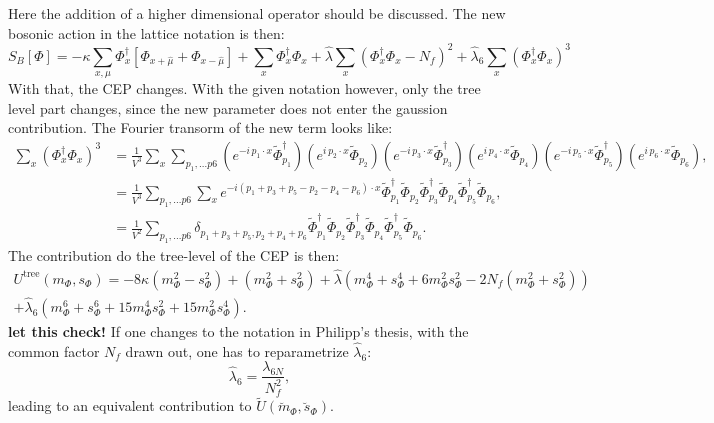 Here the addition of a higher dimensional operator should be discussed. The new bosonic action in the lattice notation is then:
\begin{equation}\label{eq:bosonicLatticeActionWithLambda_6}
 S_B[\Phi]  = -\kappa \sum\limits_{x,\mu} \Phi_x^{\dagger} \left[\Phi_{x+\hat\mu} + \Phi_{x-\hat\mu} \right] 
              + \sum\limits_x \Phi_x^{\dagger} \Phi_x 
              + \hat{\lambda} \sum\limits_x \left( \Phi_x^{\dagger} \Phi_x - N_f\right)^2 + \hat \lambda_6 \sum\limits_x \left( \Phi_x^{\dagger} \Phi_x \right)^3
\end{equation}
With that, the CEP changes. With the given notation however, only the tree level part changes, since the new parameter does not enter the gaussion contribution.
The Fourier transorm of the new term looks like:
\begin{align}
 \sum\limits_{x} \left( \Phi_x^{\dagger} \Phi_x \right)^3 &= 
                     \frac{1}{V^3}  \sum\limits_{x}  \sum\limits_{p_1,\dots p6}  
                     \left( e^{-i\, p_1 \cdot x}  \tilde\Phi_{p_1}^{\dagger} \right) \left( e^{i\, p_2 \cdot x}  \tilde\Phi_{p_2} \right)
                     \left( e^{-i\, p_3 \cdot x}  \tilde\Phi_{p_3}^{\dagger} \right) \left( e^{i\, p_4 \cdot x}  \tilde\Phi_{p_4} \right)
                     \left( e^{-i\, p_5 \cdot x}  \tilde\Phi_{p_5}^{\dagger} \right) \left( e^{i\, p_6 \cdot x}  \tilde\Phi_{p_6} \right), \nonumber \\
                  &= \frac{1}{V^3}  \sum\limits_{p_1,\dots p6} 
                     \sum\limits_{x}  e^{ -i (p_1 + p_3 + p_5 - p_2 - p_4 - p_6) \cdot x }  
                     \tilde\Phi_{p_1}^{\dagger} \tilde\Phi_{p_2} \tilde\Phi_{p_3}^{\dagger} \tilde\Phi_{p_4} \tilde\Phi_{p_5}^{\dagger} \tilde\Phi_{p_6},
                     \nonumber \\
                  &= \frac{1}{V^2}\sum\limits_{p_1,\dots p6} \delta_{p_1 + p_3 + p_5, p_2 + p_4 + p_6} 
                     \tilde\Phi_{p_1}^{\dagger} \tilde\Phi_{p_2} \tilde\Phi_{p_3}^{\dagger} \tilde\Phi_{p_4} \tilde\Phi_{p_5}^{\dagger} \tilde\Phi_{p_6}
                      \label{eq:FourierTrafoPhiToTheSix}.
\end{align}
The contribution do the tree-level of the CEP is then:
\begin{multline}\label{eq:CEP_tree_level_Contribution_from_lambda_6}
 U^{\text{tree}}(m_{\Phi},s_{\Phi}) = -8 \kappa \left( m_{\Phi}^2 - s_{\Phi}^2 \right)   +   \left( m_{\Phi}^2 + s_{\Phi}^2 \right) 
                         + \hat\lambda \left( m_{\Phi}^4 + s_{\Phi}^4 + 6 m_{\Phi}^2 s_{\Phi}^2 - 2 N_f \left(m_{\Phi}^2 + s_{\Phi}^2 \right) \right) \\
                         + \hat\lambda_6 \left( m_{\Phi}^6 + s_{\Phi}^6 + 15 m_{\Phi}^4 s_{\Phi}^2 + 15 m_{\Phi}^2 s_{\Phi}^4\right).
\end{multline}
\textbf{let this check!}
If one changes to the notation in Philipp's thesis, with the common factor $N_f$ drawn out, one has to reparametrize $\hat\lambda_6$:
\begin{equation}\label{eq:lambda_6_reparametrized}
 \hat \lambda_6 = \frac{\lambda_{6N}}{N_f^2},
\end{equation}
leading to an equivalent contribution to $\tilde U(\breve{m}_{\Phi},\breve{s}_{\Phi})$.



